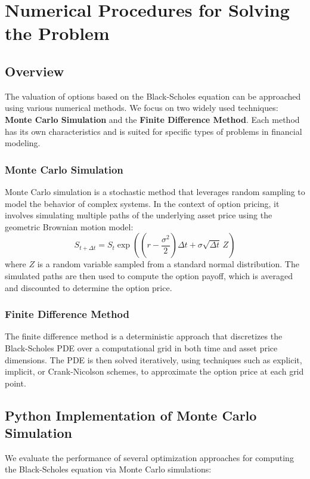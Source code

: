 \documentclass[12pt,a4paper]{report}
\begin{document}
\chapter{Numerical Procedures for Solving the Problem}

\section{Overview}
The valuation of options based on the Black-Scholes equation can be approached using various numerical methods. We focus on two widely used techniques: \textbf{Monte Carlo Simulation} and the \textbf{Finite Difference Method}. Each method has its own characteristics and is suited for specific types of problems in financial modeling.

\subsection{Monte Carlo Simulation}
Monte Carlo simulation is a stochastic method that leverages random sampling to model the behavior of complex systems. In the context of option pricing, it involves simulating multiple paths of the underlying asset price using the geometric Brownian motion model:
\[
S_{t+\Delta t} = S_t \exp \left( \left(r - \frac{\sigma^2}{2}\right)\Delta t + \sigma \sqrt{\Delta t} \, Z \right)
\]
where \(Z\) is a random variable sampled from a standard normal distribution. The simulated paths are then used to compute the option payoff, which is averaged and discounted to determine the option price.

\subsection{Finite Difference Method}
The finite difference method is a deterministic approach that discretizes the Black-Scholes PDE over a computational grid in both time and asset price dimensions. The PDE is then solved iteratively, using techniques such as explicit, implicit, or Crank-Nicolson schemes, to approximate the option price at each grid point.
\section{Python Implementation of Monte Carlo Simulation}

We evaluate the performance of several optimization approaches for computing the Black-Scholes equation via Monte Carlo simulations:
\end{document}

